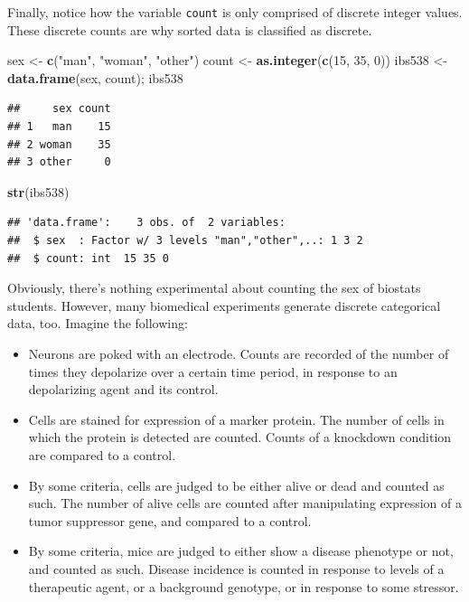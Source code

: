 \documentclass[]{book}
\newenvironment{Shaded}{\begin{snugshade}}{\end{snugshade}}
\newcommand{\DecValTok}[1]{\textcolor[rgb]{0.00,0.00,0.81}{#1}}
\newcommand{\KeywordTok}[1]{\textcolor[rgb]{0.13,0.29,0.53}{\textbf{#1}}}
\newcommand{\NormalTok}[1]{#1}
\newcommand{\StringTok}[1]{\textcolor[rgb]{0.31,0.60,0.02}{#1}}
\providecommand{\tightlist}{%
  \setlength{\itemsep}{0pt}\setlength{\parskip}{0pt}}
\begin{document}
Finally, notice how the variable \texttt{count} is only comprised of discrete integer values. These discrete counts are why sorted data is classified as discrete.

\begin{Shaded}
\begin{Highlighting}[]
\NormalTok{sex <-}\StringTok{ }\KeywordTok{c}\NormalTok{(}\StringTok{"man"}\NormalTok{, }\StringTok{"woman"}\NormalTok{, }\StringTok{"other"}\NormalTok{)}
\NormalTok{count <-}\StringTok{ }\KeywordTok{as.integer}\NormalTok{(}\KeywordTok{c}\NormalTok{(}\DecValTok{15}\NormalTok{, }\DecValTok{35}\NormalTok{, }\DecValTok{0}\NormalTok{))}
\NormalTok{ibs538 <-}\StringTok{ }\KeywordTok{data.frame}\NormalTok{(sex, count); ibs538}
\end{Highlighting}
\end{Shaded}

\begin{verbatim}
##     sex count
## 1   man    15
## 2 woman    35
## 3 other     0
\end{verbatim}

\begin{Shaded}
\begin{Highlighting}[]
\KeywordTok{str}\NormalTok{(ibs538)}
\end{Highlighting}
\end{Shaded}

\begin{verbatim}
## 'data.frame':    3 obs. of  2 variables:
##  $ sex  : Factor w/ 3 levels "man","other",..: 1 3 2
##  $ count: int  15 35 0
\end{verbatim}

Obviously, there's nothing experimental about counting the sex of biostats students. However, many biomedical experiments generate discrete categorical data, too. Imagine the following:

\begin{itemize}
\tightlist
\item
  Neurons are poked with an electrode. Counts are recorded of the number of times they depolarize over a certain time period, in response to an depolarizing agent and its control.
\item
  Cells are stained for expression of a marker protein. The number of cells in which the protein is detected are counted. Counts of a knockdown condition are compared to a control.
\item
  By some criteria, cells are judged to be either alive or dead and counted as such. The number of alive cells are counted after manipulating expression of a tumor suppressor gene, and compared to a control.
\item
  By some criteria, mice are judged to either show a disease phenotype or not, and counted as such. Disease incidence is counted in response to levels of a therapeutic agent, or a background genotype, or in response to some stressor.
\end{itemize}
\end{document}
